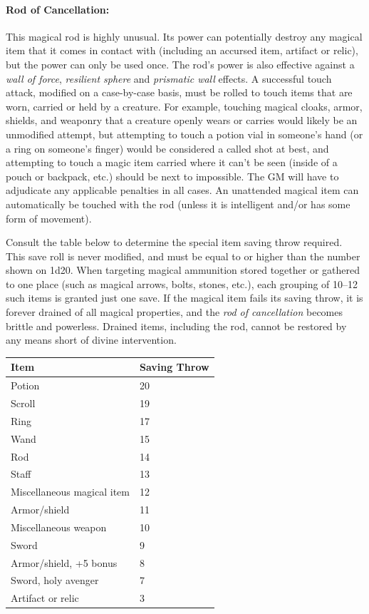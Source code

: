 \begin{multicols}{2}
\paragraph{Rod of Cancellation:} This magical rod is highly unusual.  Its power can potentially destroy any magical item that it comes in contact with (including an accursed item, artifact or relic), but the power can only be used once.  The rod's power is also effective against a \textit{wall of force}, \textit{resilient sphere} and \textit{prismatic wall} effects.  A successful touch attack, modified on a case-by-case basis, must be rolled to touch items that are worn, carried or held by a creature.  For example, touching magical cloaks, armor, shields, and weaponry that a creature openly wears or carries would likely be an unmodified attempt, but attempting to touch a potion vial in someone's hand (or a ring on someone's finger) would be considered a called shot at best, and attempting to touch a magic item carried where it can't be seen (inside of a pouch or backpack, etc.) should be next to impossible.  The GM will have to adjudicate any applicable penalties in all cases.  An unattended magical item can automatically be touched with the rod (unless it is intelligent and/or has some form of movement).  

Consult the table below to determine the special item saving throw required.  This save roll is never modified, and must be equal to or higher than the number shown on 1d20.  When targeting magical ammunition stored together or gathered to one place (such as magical arrows, bolts, stones, etc.), each grouping of 10--12 such items is granted just one save.  If the magical item fails its saving throw, it is forever drained of all magical properties, and the \textit{rod of cancellation} becomes brittle and powerless.  Drained items, including the rod, cannot be restored by any means short of divine intervention.

\noindent
\begin{tabular}{|p{}|p{}|}
\hline
Item	& Saving Throw \\
\hline\hline
\rowcolor[gray]{.9}Potion	& 20 \\
Scroll	& 19 \\
\rowcolor[gray]{.9}Ring	& 17 \\
Wand	& 15 \\
\rowcolor[gray]{.9}Rod	& 14 \\
Staff	& 13 \\
\rowcolor[gray]{.9}Miscellaneous magical item	& 12 \\
Armor/shield	& 11 \\
\rowcolor[gray]{.9}Miscellaneous weapon	& 10 \\
Sword	& 9 \\
\rowcolor[gray]{.9}Armor/shield, +5 bonus	& 8 \\
Sword, holy avenger	& 7 \\
\rowcolor[gray]{.9}Artifact or relic	& 3 \\
\hline
\end{tabular}


\end{multicols}
